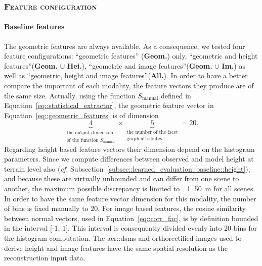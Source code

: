         \subsubsection{\textsc{Feature configuration}}
            \label{subsubsec::experiments::evaluation::setup::feature_configurations}
            \paragraph{Baseline features}
                The geometric features are always available.
                As a consequence, we tested four feature configurations: ``geometric features'' (\textbf{Geom.}) only, ``geometric and height features''(\textbf{Geom.} $\cup$ \textbf{Hei.}), ``geometric and image features''(\textbf{Geom.} $\cup$ \textbf{Im.}) as well as ``geometric, height and image features''(\textbf{All.}).
                In order to have a better compare the important of each modality, the feature vectors they produce are of the same size.
                Actually, using the function \(S_{\text{manual}}\) defined in Equation~\ref{eq::statistical_extractor}, the geometric feature vector in Equation~\ref{eq::geometric_features} is of dimension
                \begin{equation*}
                    \underbrace{4}_{\substack{\text{the output dimension}\\\text{of the function } S_{\text{manual}} }} \times \underbrace{5}_{\substack{\text{the number of the facet}\\\text{graph attributes}}} = 20.
                \end{equation*}
                Regarding height based feature vectors their dimension depend on the histogram parameters.
                Since we compute differences between observed and model height at terrain level also (\textit{cf.} Subsection~\ref{subsec::learned_evaluation::baseline::height}), and because these are virtually unbounded and can differ from one scene to another, the maximum possible discrepancy is limited to \SI{\pm 50}{\m} for all scenes.
                In order to have the same feature vector dimension for this modality, the number of bins is fixed manually to \(20\).
                For image based features, the cosine similarity between normal vectors, used in Equation~\ref{eq::corr_fac}, is by definition bounded in the interval [-1, 1].
                This interval is consequently divided evenly into \(20\) bins for the histogram computation.
                The \glspl{acr::dsm} and orthorectified images used to derive height and image features have the same spatial resolution as the reconstruction input data.\\


